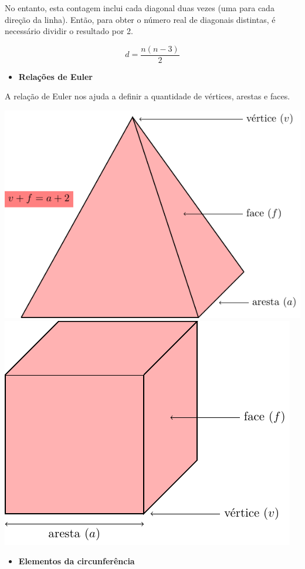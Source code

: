 {No entanto, esta contagem inclui cada diagonal duas vezes (uma para cada
direção da linha). Então, para obter o número real de diagonais distintas,
é necessário dividir o resultado por 2.

$$d = \frac{n(n-3)}{2}$$



\begin{itemize}
  \item \textbf{Relações de Euler}
\end{itemize}

A relação de Euler nos ajuda a definir a quantidade de vértices, arestas
e faces.\medskip

\includegraphics[width=.45\textwidth]{./tikz/018.pdf}
\includegraphics[width=.45\textwidth]{./tikz/017.pdf}

\begin{itemize}
  \item \textbf{Elementos da circunferência}
\end{itemize}

}
